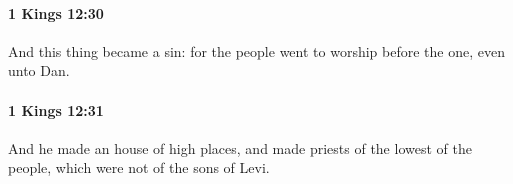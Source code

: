 		\paragraph{1 Kings 12:30} %
			\label{1KINGS-12-30}

			And this thing became a sin: for the people went to worship before the one, even unto Dan.


		\paragraph{1 Kings 12:31} %
			\label{1KINGS-12-31}

			And he made an house of high places, and made priests of the lowest of the people, which were not of the sons of Levi.


